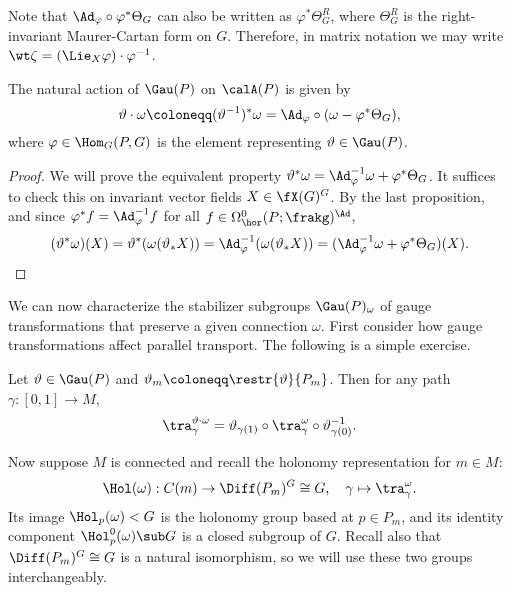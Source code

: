 \begin{rem}
    Note that $\Ad_\varphi\circ \varphi^\ast\Theta_G$ can also be written as $\varphi^\ast\Theta_G^R$, where $\Theta_G^R$ is the right-invariant Maurer-Cartan form on $G$. Therefore, in matrix notation we may write $\wt\zeta=(\Lie_X\varphi)\cdot \varphi^{-1}$.
\end{rem}

\begin{prop}\label{prop action of Gau(P) on calA(P)}
    The natural action of $\Gau(P)$ on $\calA(P)$ is given by
    \[\vartheta\cdot\omega\coloneqq (\vartheta^{-1})^\ast\omega=\Ad_\varphi \circ (\omega-\varphi^\ast \Theta_G),\]
    where $\varphi\in \Hom_G(P,G)$ is the element representing $\vartheta\in \Gau(P)$.
\end{prop}
\begin{proof}
    We will prove the equivalent property $\vartheta^\ast\omega=\Ad_\varphi^{-1}\omega+\varphi^\ast\Theta_G$. It suffices to check this on invariant vector fields $X\in \fX(G)^G$. By the last proposition, and since $\varphi^\ast f=\Ad_\varphi^{-1}f$ for all $f\in \Omega^0_{\hor}(P;\frakg)^\Ad$, 
    \[(\vartheta^\ast\omega)(X)=\vartheta^\ast(\omega(\vartheta_\ast X))=\Ad_\varphi^{-1}(\omega(\vartheta_\ast X))=(\Ad_\varphi^{-1}\omega+\varphi^\ast\Theta_G)(X).\]
\end{proof}

We can now characterize the stabilizer subgroups $\Gau(P)_\omega$ of gauge transformations that preserve a given connection $\omega$. First consider how gauge transformations affect parallel transport. The following is a simple exercise.

\begin{lem}\label{lem 31794}
    Let $\vartheta\in\Gau(P)$ and $\vartheta_m\coloneqq\restr{\vartheta}{P_m}$. Then for any path $\gamma:[0,1]\to M$, 
    \[\tra_{\gamma}^{\vartheta\cdot\omega}=\vartheta_{\gamma(1)}\circ\tra_\gamma^\omega \circ\vartheta_{\gamma(0)}^{-1}.\]
\end{lem}

Now suppose $M$ is connected and recall the holonomy representation for $m\in M$:
\[\Hol(\omega):C(m)\to \Diff(P_m)^G\cong G,\quad \gamma\mapsto \tra_\gamma^\omega.\]
Its image $\Hol_p(\omega)< G$ is the holonomy group based at $p\in P_m$, and its identity component $\Hol^0_p(\omega)\sub G$ is a closed subgroup of $G$. Recall also that $\Diff(P_m)^G\cong G$ is a natural isomorphism, so we will use these two groups interchangeably.

